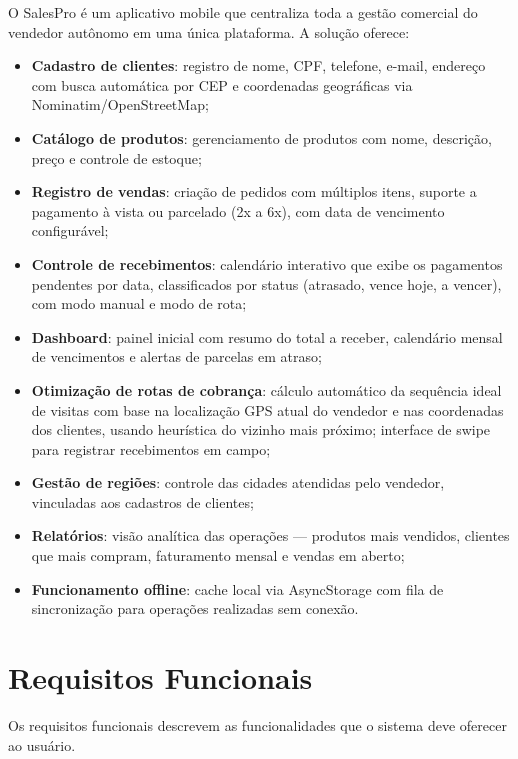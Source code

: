 \documentclass[
	12pt,				%
	oneside,			%
	a4paper,			%
	english,			%
	brazil				%
	]{abntex2}
\begin{document}
O SalesPro é um aplicativo mobile que centraliza toda a gestão comercial do vendedor autônomo em uma única plataforma. A solução oferece:

\begin{itemize}
  \item \textbf{Cadastro de clientes}: registro de nome, CPF, telefone, e-mail, endereço com busca automática por CEP e coordenadas geográficas via Nominatim/OpenStreetMap;
  \item \textbf{Catálogo de produtos}: gerenciamento de produtos com nome, descrição, preço e controle de estoque;
  \item \textbf{Registro de vendas}: criação de pedidos com múltiplos itens, suporte a pagamento à vista ou parcelado (2x a 6x), com data de vencimento configurável;
  \item \textbf{Controle de recebimentos}: calendário interativo que exibe os pagamentos pendentes por data, classificados por status (atrasado, vence hoje, a vencer), com modo manual e modo de rota;
  \item \textbf{Dashboard}: painel inicial com resumo do total a receber, calendário mensal de vencimentos e alertas de parcelas em atraso;
  \item \textbf{Otimização de rotas de cobrança}: cálculo automático da sequência ideal de visitas com base na localização GPS atual do vendedor e nas coordenadas dos clientes, usando heurística do vizinho mais próximo; interface de swipe para registrar recebimentos em campo;
  \item \textbf{Gestão de regiões}: controle das cidades atendidas pelo vendedor, vinculadas aos cadastros de clientes;
  \item \textbf{Relatórios}: visão analítica das operações — produtos mais vendidos, clientes que mais compram, faturamento mensal e vendas em aberto;
  \item \textbf{Funcionamento offline}: cache local via AsyncStorage com fila de sincronização para operações realizadas sem conexão.
\end{itemize}

\section{Requisitos Funcionais}

Os requisitos funcionais descrevem as funcionalidades que o sistema deve oferecer ao usuário.
\end{document}
